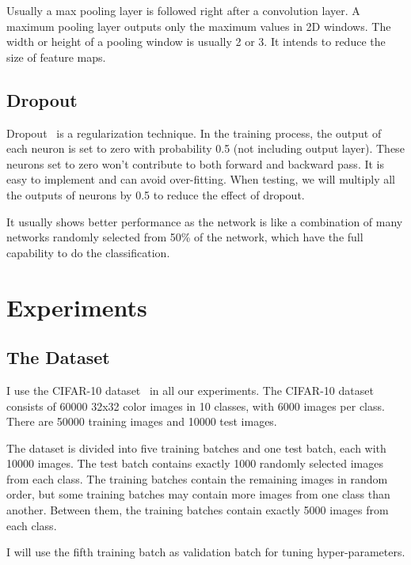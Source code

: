 \documentclass{article} %
\begin{document}
Usually a max pooling layer is followed right after a convolution layer. A maximum pooling layer outputs only the maximum values in 2D windows. The width or height of a pooling window is usually 2 or 3. It intends to reduce the size of feature maps.

\subsection{Dropout} %
\label{sub:dropout}

Dropout~\cite{Bell} is a regularization technique. In the training process, the output of each neuron is set to zero with probability 0.5 (not including output layer). These neurons set to zero won't contribute to both forward and backward pass. It is easy to implement and can avoid over-fitting. When testing, we will multiply all the outputs of neurons by 0.5 to reduce the effect of dropout.

It usually shows better performance as the network is like a combination of many networks randomly selected from 50\% of the network, which have the full capability to do the classification.


\section{Experiments}

\label{sec:Experiments}

\subsection{The Dataset}

I use the CIFAR-10 dataset~\cite{Krizhevsky} in all our experiments. The CIFAR-10 dataset consists of 60000 32x32 color images in 10 classes, with 6000 images per class. There are 50000 training images and 10000 test images. 

The dataset is divided into five training batches and one test batch, each with 10000 images. The test batch contains exactly 1000 randomly selected images from each class. The training batches contain the remaining images in random order, but some training batches may contain more images from one class than another. Between them, the training batches contain exactly 5000 images from each class.

I will use the fifth training batch as validation batch for tuning hyper-parameters.
\end{document}
